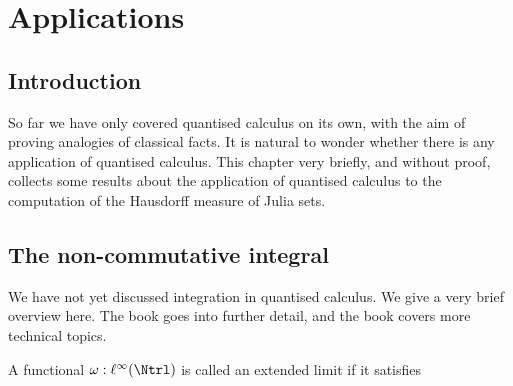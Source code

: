 
\chapter{Applications} %

\label{Applications} %



\section{Introduction}
So far we have only covered quantised calculus on its own, 
with the aim of proving analogies of classical facts. It is natural
to wonder whether there is any application of quantised calculus. This
chapter very briefly, and without proof, collects
some results about the application of quantised calculus to the computation
of the Hausdorff measure of Julia sets.

\section{The non-commutative integral}
We have not yet discussed integration in quantised calculus. We give
a very brief overview here. The book \cite{Connes94} goes into further
detail, and the book \cite{SingularTraces} covers more technical topics.

\begin{definition}
    A functional $\omega:\ell^\infty(\Ntrl)$ is called an extended
    limit if it satisfies 
\end{definition}    






